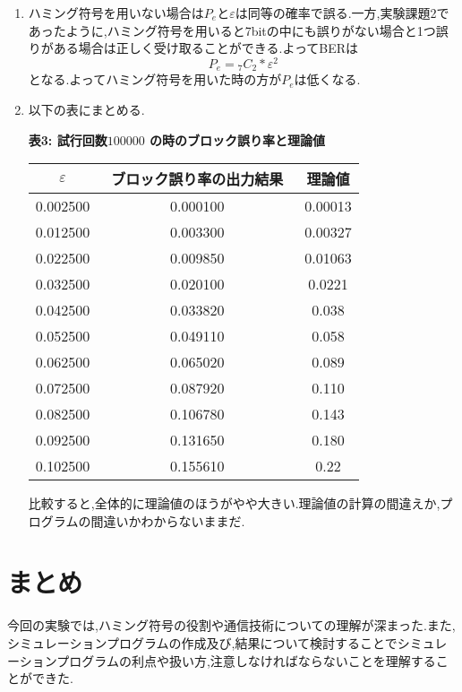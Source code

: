 \documentclass[12pt]{jarticle}
\begin{document}
\begin{enumerate}
\item
  ハミング符号を用いない場合は$P_e$と$\varepsilon$は同等の確率で誤る.一方,実験課題2であったように,ハミング符号を用いると7bitの中にも誤りがない場合と1つ誤りがある場合は正しく受け取ることができる.よってBERは
  \begin{equation}
P_e = {}_7C_2 * \varepsilon^2
  \end{equation}
  となる.よってハミング符号を用いた時の方が$P_e$は低くなる.
\item
  以下の表にまとめる.
\begin{center}
    \textbf{表3: 試行回数$100000$ の時のブロック誤り率と理論値}
    \begin{tabular}{|c|c|c|} \hline
      $\varepsilon$ & ブロック誤り率の出力結果　& 理論値 \\ \hline
      0.002500    &  0.000100 & 0.00013 \\ \hline
      0.012500    &  0.003300 & 0.00327 \\ \hline
      0.022500    &  0.009850 & 0.01063  \\ \hline
      0.032500    &  0.020100 & 0.0221   \\ \hline
      0.042500    &  0.033820 & 0.038    \\ \hline
      0.052500    &  0.049110 & 0.058   \\ \hline
      0.062500    &  0.065020 & 0.089   \\ \hline
      0.072500    &  0.087920 & 0.110   \\ \hline
      0.082500    &  0.106780 & 0.143   \\ \hline
      0.092500    &  0.131650 & 0.180   \\ \hline
      0.102500    &  0.155610 & 0.22    \\ \hline
    \end{tabular}
\end{center}
  比較すると,全体的に理論値のほうがやや大きい.理論値の計算の間違えか,プログラムの間違いかわからないままだ.
\end{enumerate}

\section{まとめ}
今回の実験では,ハミング符号の役割や通信技術についての理解が深まった.また,
シミュレーションプログラムの作成及び,結果について検討することでシミュレーションプログラムの利点や扱い方,注意しなければならないことを理解することができた.
\end{document}
